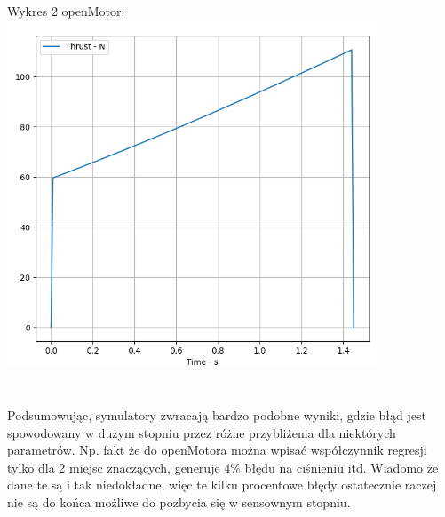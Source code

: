 \documentclass{article}
\begin{document}
Wykres 2 openMotor:\\
\includegraphics[width=11cm]{openMotor2}\\\\\\
Podsumowując, symulatory zwracają bardzo podobne wyniki, gdzie błąd jest spowodowany w dużym stopniu przez różne przybliżenia dla niektórych parametrów. Np. fakt że do openMotora można wpisać współczynnik regresji tylko dla 2 miejsc znaczących, generuje 4\% błędu na ciśnieniu itd. Wiadomo że dane te są i tak niedokładne, więc te kilku procentowe błędy ostatecznie raczej nie są do końca możliwe do pozbycia się w sensownym stopniu.
\end{document}
